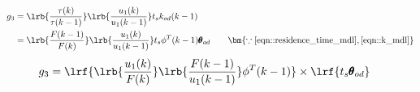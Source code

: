 \begin{align*}
        g_3 &= \lrb{\frac{\tau(k)}{\tau(k-1)}}
                                \lrb{\frac{u_1(k)}{u_1(k-1)}}
                t_s k_{od}(k-1)\\
                &= \lrb{\frac{F(k-1)}{F(k)}}
                                \lrb{\frac{u_1(k)}{u_1(k-1)}}
                t_s \phi^T(k-1) \pmb \theta_{od}
                \qquad \bm{\because \ref{eqn::residence_time_mdl}, \ref{eqn::k_mdl}}
\end{align*}
\begin{align}
        g_3 &= \lrf{ \lrb{\frac{u_1(k)}{F(k)}} \lrb{\frac{F(k-1)}{u_1(k-1)}} \phi^T(k-1) }
                \times \lrf{t_s \pmb \theta_{od}}
\end{align}
